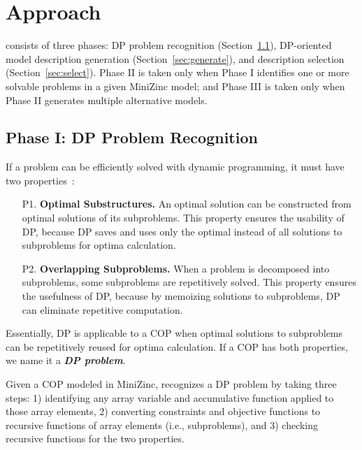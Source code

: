  \section{Approach}\label{sec:approach}
 
 \tool consists of three phases: DP problem recognition (Section~\ref{sec:recognize}), DP-oriented model description generation (Section~\ref{sec:generate}), and description selection (Section~\ref{sec:select}). 
 Phase II is taken only when Phase I identifies one or more solvable problems in a given MiniZinc model; and Phase III is taken only when Phase II generates multiple alternative models. 
 
 \subsection{Phase I: DP Problem Recognition}
 \label{sec:recognize}
If a problem can be efficiently solved with dynamic programming, it must have two  properties~\cite{T2012Introduction}:

\begin{enumerate}
    \item[P1.] \textbf{Optimal Substructures.} An optimal solution can be constructed from optimal solutions of its subproblems. This property ensures the usability of DP, because DP saves and uses only the optimal instead of all solutions to subproblems for optima calculation. 
    
   \item[P2.] \textbf{Overlapping Subproblems.} 
   When a problem is decomposed into subproblems, some  subproblems are repetitively solved. 
   This property ensures the usefulness of DP, because by memoizing solutions to subproblems, DP can eliminate repetitive computation. 
\end{enumerate}
Essentially, DP is applicable to a COP when optimal solutions to subproblems can be repetitively reused for optima calculation.
If a COP has both properties, we name it a 
\textbf{\emph{DP problem}}.  
 
 Given a COP modeled in MiniZinc, \tool recognizes a DP problem by taking three steps: 1) identifying 
 any array variable and accumulative function applied to those array elements, 
 2) converting constraints and objective functions to recursive functions of array elements (i.e., subproblems), and 
 3) checking recursive functions for the two properties. 

